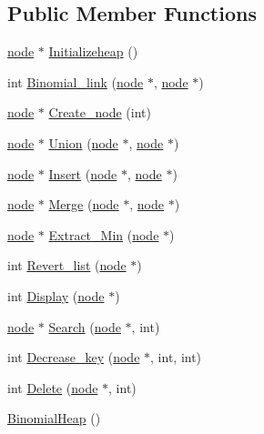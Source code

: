 \subsection*{Public Member Functions}
\begin{DoxyCompactItemize}
\item 
\hyperlink{structnode}{node} $\ast$ \hyperlink{classBinomialHeap_a3ffaab6756189d14dd76e4e7a48147b6}{Initializeheap} ()
\item 
int \hyperlink{classBinomialHeap_a657d892542f95da35f386fbe35564a35}{Binomial\+\_\+link} (\hyperlink{structnode}{node} $\ast$, \hyperlink{structnode}{node} $\ast$)
\item 
\hyperlink{structnode}{node} $\ast$ \hyperlink{classBinomialHeap_a60a7f08bad4dd38fe2b3000d6e29724e}{Create\+\_\+node} (int)
\item 
\hyperlink{structnode}{node} $\ast$ \hyperlink{classBinomialHeap_aea4c422323bcafcedb9168c86adadfa8}{Union} (\hyperlink{structnode}{node} $\ast$, \hyperlink{structnode}{node} $\ast$)
\item 
\hyperlink{structnode}{node} $\ast$ \hyperlink{classBinomialHeap_a762a7e29d6bea85540f1a82cbca4a062}{Insert} (\hyperlink{structnode}{node} $\ast$, \hyperlink{structnode}{node} $\ast$)
\item 
\hyperlink{structnode}{node} $\ast$ \hyperlink{classBinomialHeap_ade996e0273f3fcfa92b4dcce69ed111b}{Merge} (\hyperlink{structnode}{node} $\ast$, \hyperlink{structnode}{node} $\ast$)
\item 
\hyperlink{structnode}{node} $\ast$ \hyperlink{classBinomialHeap_a71e1468e2782db3f2322d188bca1e48a}{Extract\+\_\+\+Min} (\hyperlink{structnode}{node} $\ast$)
\item 
int \hyperlink{classBinomialHeap_a59481a0ec3750711c68e9ddd21443707}{Revert\+\_\+list} (\hyperlink{structnode}{node} $\ast$)
\item 
int \hyperlink{classBinomialHeap_a43b3339eb8cc6eea26f769ab616b720a}{Display} (\hyperlink{structnode}{node} $\ast$)
\item 
\hyperlink{structnode}{node} $\ast$ \hyperlink{classBinomialHeap_a5066787434a932210311500f671d2202}{Search} (\hyperlink{structnode}{node} $\ast$, int)
\item 
int \hyperlink{classBinomialHeap_a3898a1fb87677fdb94a40f62ac416de9}{Decrease\+\_\+key} (\hyperlink{structnode}{node} $\ast$, int, int)
\item 
int \hyperlink{classBinomialHeap_aab7ea7e42fe1b2aaf3298f73f4e68884}{Delete} (\hyperlink{structnode}{node} $\ast$, int)
\item 
\hyperlink{classBinomialHeap_ace4f32509eae5e8508433d7e291f2a3e}{Binomial\+Heap} ()
\end{DoxyCompactItemize}
